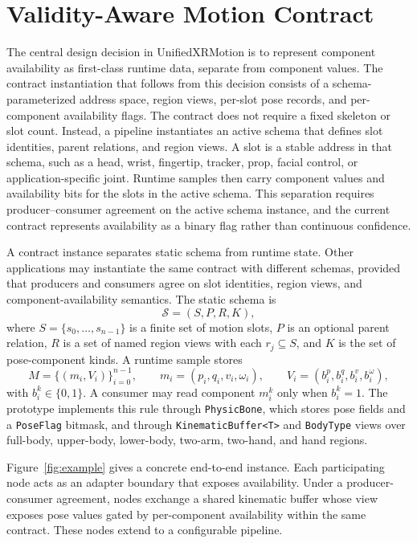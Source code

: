 \documentclass[runningheads]{llncs}
\begin{document}
\section{Validity-Aware Motion Contract}\label{sec:contract}
The central design decision in UnifiedXRMotion is to represent component availability as first-class runtime data, separate from component values. The contract instantiation that follows from this decision consists of a schema-parameterized address space, region views, per-slot pose records, and per-component availability flags. The contract does not require a fixed skeleton or slot count. Instead, a pipeline instantiates an active schema that defines slot identities, parent relations, and region views. A slot is a stable address in that schema, such as a head, wrist, fingertip, tracker, prop, facial control, or application-specific joint. Runtime samples then carry component values and availability bits for the slots in the active schema. This separation requires producer--consumer agreement on the active schema instance, and the current contract represents availability as a binary flag rather than continuous confidence.

A contract instance separates static schema from runtime state. Other applications may instantiate the same contract with different schemas, provided that producers and consumers agree on slot identities, region views, and component-availability semantics. The static schema is
\begin{equation}
	\mathcal{S}=(S,P,R,K),
\end{equation}
where $S=\{s_0,\ldots,s_{n-1}\}$ is a finite set of motion slots, $P$ is an optional parent relation, $R$ is a set of named region views with each $r_j\subseteq S$, and $K$ is the set of pose-component kinds. A runtime sample stores
\begin{equation}
	M=\{(m_i,V_i)\}_{i=0}^{n-1}, \qquad
	m_i=(p_i,q_i,v_i,\omega_i), \qquad
	V_i=(b^p_i,b^q_i,b^v_i,b^\omega_i),
\end{equation}
with $b_i^k\in\{0,1\}$. A consumer may read component $m_i^k$ only when $b_i^k=1$. The prototype implements this rule through \texttt{PhysicBone}, which stores pose fields and a \texttt{PoseFlag} bitmask, and through \texttt{KinematicBuffer<T>} and \texttt{BodyType} views over full-body, upper-body, lower-body, two-arm, two-hand, and hand regions.

%
Figure~\ref{fig:example} gives a concrete end-to-end instance.
Each participating node acts as an adapter boundary that exposes availability. 
Under a producer-consumer agreement, nodes exchange a shared kinematic buffer whose view exposes pose values gated by per-component availability within the same contract.
These nodes extend to a configurable pipeline.
\end{document}
